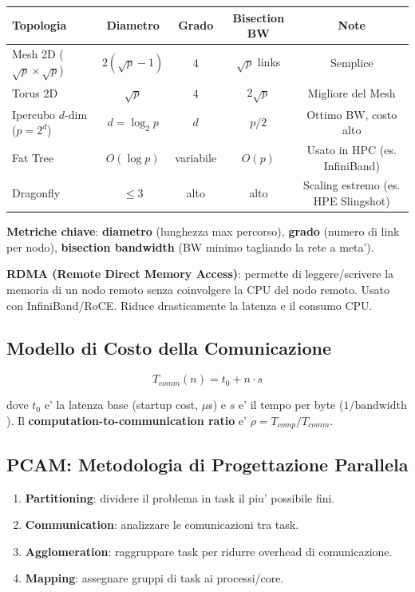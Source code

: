 \documentclass[11pt,a4paper]{article}
\theoremstyle{remark}
\begin{document}
\begin{center}
\begin{tabular}{lcccc}
\toprule
\textbf{Topologia} & \textbf{Diametro} & \textbf{Grado} & \textbf{Bisection BW} & \textbf{Note} \\
\midrule
Mesh 2D ($\sqrt{p} \times \sqrt{p}$) & $2(\sqrt{p}-1)$ & 4 & $\sqrt{p}$ links & Semplice \\
Torus 2D & $\sqrt{p}$ & 4 & $2\sqrt{p}$ & Migliore del Mesh \\
Ipercubo $d$-dim ($p=2^d$) & $d = \log_2 p$ & $d$ & $p/2$ & Ottimo BW, costo alto \\
Fat Tree & $O(\log p)$ & variabile & $O(p)$ & Usato in HPC (es. InfiniBand) \\
Dragonfly & $\leq 3$ & alto & alto & Scaling estremo (es. HPE Slingshot) \\
\bottomrule
\end{tabular}
\end{center}

\textbf{Metriche chiave}: \textbf{diametro} (lunghezza max percorso), \textbf{grado} (numero di link per nodo), \textbf{bisection bandwidth} (BW minimo tagliando la rete a meta').

\textbf{RDMA (Remote Direct Memory Access)}: permette di leggere/scrivere la memoria di un nodo remoto senza coinvolgere la CPU del nodo remoto. Usato con InfiniBand/RoCE. Riduce drasticamente la latenza e il consumo CPU.

\subsection{Modello di Costo della Comunicazione}

\begin{equation}
T_{comm}(n) = t_0 + n \cdot s
\end{equation}

dove $t_0$ e' la latenza base (startup cost, $\mu$s) e $s$ e' il tempo per byte ($1/\text{bandwidth}$). Il \textbf{computation-to-communication ratio} e' $\rho = T_{comp} / T_{comm}$.

\subsection{PCAM: Metodologia di Progettazione Parallela}

\begin{enumerate}
  \item \textbf{Partitioning}: dividere il problema in task il piu' possibile fini.
  \item \textbf{Communication}: analizzare le comunicazioni tra task.
  \item \textbf{Agglomeration}: raggruppare task per ridurre overhead di comunicazione.
  \item \textbf{Mapping}: assegnare gruppi di task ai processi/core.
\end{enumerate}
\end{document}
